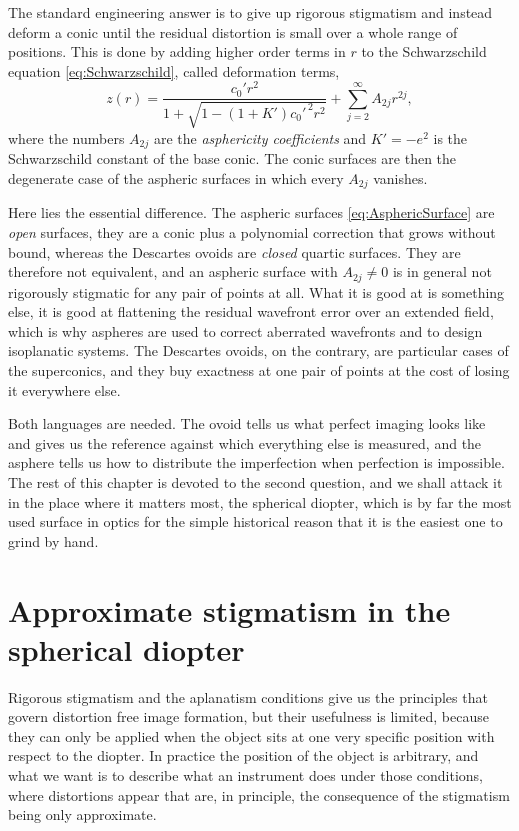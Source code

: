                 The standard engineering answer is to give up rigorous stigmatism and instead deform a conic until the residual distortion is small over a whole range of positions. This is done by adding higher order terms in $r$ to the Schwarzschild equation \ref{eq:Schwarzschild}, called deformation terms,
                \begin{equation}\label{eq:AsphericSurface}
                    z(r) = \frac{c_0'r^2}{1+\sqrt{1-\left(1+K'\right)c_0'^{\,2}r^2}} + \sum_{j=2}^{\infty}A_{2j}r^{2j},
                \end{equation}
                where the numbers $A_{2j}$ are the \emph{asphericity coefficients} and $K' = -e^2$ is the Schwarzschild constant of the base conic. The conic surfaces are then the degenerate case of the aspheric surfaces in which every $A_{2j}$ vanishes.

                Here lies the essential difference. The aspheric surfaces \ref{eq:AsphericSurface} are \textit{open} surfaces, they are a conic plus a polynomial correction that grows without bound, whereas the Descartes ovoids are \textit{closed} quartic surfaces. They are therefore not equivalent, and an aspheric surface with $A_{2j}\neq0$ is in general not rigorously stigmatic for any pair of points at all. What it is good at is something else, it is good at flattening the residual wavefront error over an extended field, which is why aspheres are used to correct aberrated wavefronts and to design isoplanatic systems. The Descartes ovoids, on the contrary, are particular cases of the superconics, and they buy exactness at one pair of points at the cost of losing it everywhere else.

                Both languages are needed. The ovoid tells us what perfect imaging looks like and gives us the reference against which everything else is measured, and the asphere tells us how to distribute the imperfection when perfection is impossible. The rest of this chapter is devoted to the second question, and we shall attack it in the place where it matters most, the spherical diopter, which is by far the most used surface in optics for the simple historical reason that it is the easiest one to grind by hand.

        \section{Approximate stigmatism in the spherical diopter}

                Rigorous stigmatism and the aplanatism conditions give us the principles that govern distortion free image formation, but their usefulness is limited, because they can only be applied when the object sits at one very specific position with respect to the diopter. In practice the position of the object is arbitrary, and what we want is to describe what an instrument does under those conditions, where distortions appear that are, in principle, the consequence of the stigmatism being only approximate.

